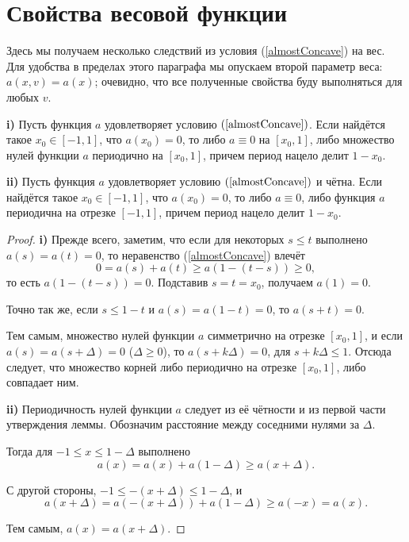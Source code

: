 \section{Свойства весовой функции}

Здесь мы получаем несколько следствий из условия (\ref{almostConcave}) на вес.
Для удобства в пределах этого параграфа мы опускаем второй параметр веса: $a(x, v) = a(x)$;
очевидно, что все полученные свойства буду выполняться для любых $v$.

\begin{lm}
\label{periodicity}
\textbf{\textup{i)}}
Пусть функция $a$ удовлетворяет условию $(\ref{almostConcave})$.
Если найдётся такое $x_0 \in [-1, 1]$, что $a(x_0) = 0$,
то либо $a \equiv 0$ на $[x_0, 1]$,
либо множество нулей функции $a$ периодично на $[x_0, 1]$, причем период нацело делит $1 - x_0$.

\textbf{\textup{ii)}}
Пусть функция $a$ удовлетворяет условию $(\ref{almostConcave})$ и чётна.
Если найдётся такое $x_0 \in [-1, 1]$, что $a(x_0) = 0$,
то либо $a \equiv 0$,
либо функция $a$ периодична на отрезке $[-1, 1]$, причем период нацело делит $1 - x_0$.
\end{lm}

\begin{proof}
\textbf{\textup{i)}}
Прежде всего, заметим, что если для некоторых $s \le t$ выполнено $a(s) = a(t) = 0$,
то неравенство (\ref{almostConcave}) влечёт
$$
0 = a(s) + a(t) \ge a(1 - (t - s)) \ge 0,
$$
то есть $a(1 - (t - s)) = 0$.
Подставив $s = t = x_0$, получаем $a(1) = 0$.

Точно так же, если $s \le 1 - t$ и $a(s) = a(1 - t) = 0$, то $a(s + t) = 0$.

Тем самым, множество нулей функции $a$ симметрично на отрезке $[x_0, 1]$,
и если $a(s) = a(s + \Delta) = 0$ ($\Delta \ge 0$),
то $a(s + k\Delta) = 0$, для $s + k\Delta \le 1$.
Отсюда следует, что множество корней либо периодично на отрезке $[x_0, 1]$, либо совпадает ним.

\textbf{\textup{ii)}}
Периодичность нулей функции $a$ следует из её чётности и из первой части утверждения леммы.
Обозначим расстояние между соседними нулями за $\Delta$.

Тогда для $-1 \le x \le 1 - \Delta$ выполнено
$$
a(x) = a(x) + a(1 - \Delta) \ge a(x + \Delta).
$$

С другой стороны, $-1 \le -(x + \Delta) \le 1 - \Delta$, и
$$
a(x + \Delta) = a(-(x + \Delta)) + a(1 - \Delta) \ge a(-x) = a(x).
$$

Тем самым, $a(x) = a(x + \Delta)$.
\end{proof}

